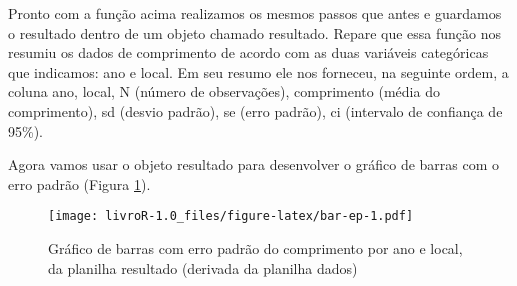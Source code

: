 \documentclass[titlepage, oneside, openany, a4paper]{book}
\newenvironment{Shaded}{\begin{snugshade}}{\end{snugshade}}
\newcommand{\DataTypeTok}[1]{\textcolor[rgb]{0.13,0.29,0.53}{#1}}
\newcommand{\DecValTok}[1]{\textcolor[rgb]{0.00,0.00,0.81}{#1}}
\newcommand{\FloatTok}[1]{\textcolor[rgb]{0.00,0.00,0.81}{#1}}
\newcommand{\KeywordTok}[1]{\textcolor[rgb]{0.13,0.29,0.53}{\textbf{#1}}}
\newcommand{\NormalTok}[1]{#1}
\newcommand{\OperatorTok}[1]{\textcolor[rgb]{0.81,0.36,0.00}{\textbf{#1}}}
\newcommand{\OtherTok}[1]{\textcolor[rgb]{0.56,0.35,0.01}{#1}}
\newcommand{\StringTok}[1]{\textcolor[rgb]{0.31,0.60,0.02}{#1}}
\begin{document}
Pronto com a função acima realizamos os mesmos passos que antes e guardamos o resultado dentro de um objeto chamado resultado. Repare que essa função nos resumiu os dados de comprimento de acordo com as duas variáveis categóricas que indicamos: ano e local. Em seu resumo ele nos forneceu, na seguinte ordem, a coluna ano, local, N (número de observações), comprimento (média do comprimento), sd (desvio padrão), se (erro padrão), ci (intervalo de confiança de 95\%).

Agora vamos usar o objeto resultado para desenvolver o gráfico de barras com o erro padrão (Figura \ref{fig:bar-ep}).

\begin{Shaded}
\end{Shaded}

\begin{figure}
\centering
\texttt{[image: livroR-1.0\_files/figure-latex/bar-ep-1.pdf]}
\caption{\label{fig:bar-ep}Gráfico de barras com erro padrão do comprimento por ano e local, da planilha resultado (derivada da planilha dados)}
\end{figure}
\end{document}
